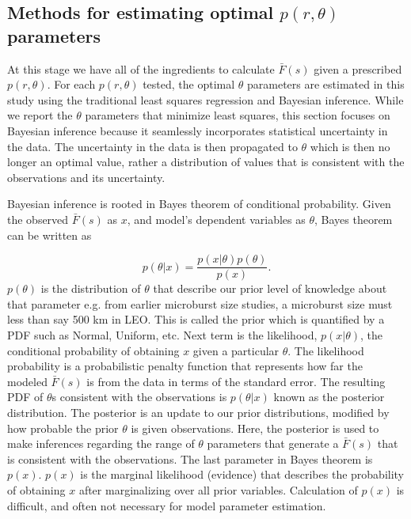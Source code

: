 \documentclass[draft]{agujournal2019}
\begin{document}
\subsection{Methods for estimating optimal $p(r, \theta)$ parameters}
At this stage we have all of the ingredients to calculate $\bar{F}(s)$ given a prescribed $p(r, \theta)$. For each $p(r, \theta)$ tested, the optimal $\theta$ parameters are estimated in this study using the traditional least squares regression and Bayesian inference. While we report the $\theta$ parameters that minimize least squares, this section focuses on Bayesian inference because it seamlessly incorporates statistical uncertainty in the data. The uncertainty in the data is then propagated to $\theta$ which is then no longer an optimal value, rather a distribution of values that is consistent with the observations and its uncertainty. 

Bayesian inference is rooted in Bayes theorem of conditional probability. Given the observed $\bar{F}(s)$ as $x$, and model's dependent variables as $\theta$, Bayes theorem can be written as

\begin{equation}
p(\theta | x) = \frac{p(x | \theta) p(\theta)}{p(x)}.
\end{equation} $p(\theta)$ is the distribution of $\theta$ that describe our prior level of knowledge about that parameter e.g. from earlier microburst size studies, a microburst size must less than say 500 km in LEO. This is called the prior which is quantified by a PDF such as Normal, Uniform, etc. Next term is the likelihood, $p(x | \theta)$, the conditional probability of obtaining $x$ given a particular $\theta$. The likelihood probability is a probabilistic penalty function that represents how far the modeled $\bar{F}(s)$ is from the data in terms of the standard error. The resulting PDF of $\theta$s consistent with the observations is $p(\theta | x)$ known as the posterior distribution. The posterior is an update to our prior distributions, modified by how probable the prior $\theta$ is given observations. Here, the posterior is used to make inferences regarding the range of $\theta$ parameters that generate a $\bar{F}(s)$ that is consistent with the observations. The last parameter in Bayes theorem is $p(x)$. $p(x)$ is the marginal likelihood (evidence) that describes the probability of obtaining $x$ after marginalizing over all prior variables. Calculation of $p(x)$ is difficult, and often not necessary for model parameter estimation. 
\end{document}
